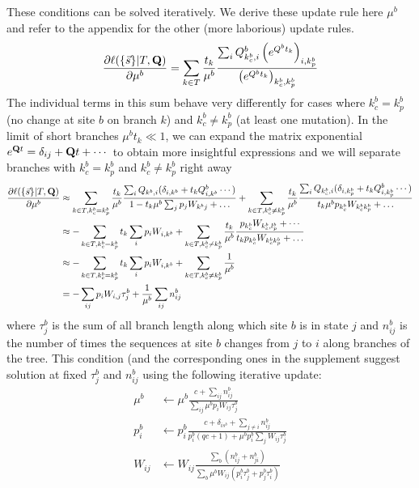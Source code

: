 \documentclass[aps,rmp,twocolumn]{revtex4}
\newcommand{\mat}[1]{{\bf #1}}
\newcommand{\eqp}{p}
\newcommand{\pc}{c}
\begin{document}
These conditions can be solved iteratively. We derive these update rule here $\mu^b$ and refer to the appendix for the other (more laborious) update rules.
\begin{equation}
	\frac{\partial \ell(\{\vec{s}\}|T,\mat{Q})}{\partial \mu^b} = \sum_{k\in T} \frac{t_k}{\mu^b}\frac{\sum_i Q^b_{k^b_c,i}\left( e^{Q^bt_k} \right)_{i, k^b_p}}{\left( e^{Q^bt_k} \right)_{k^b_c, k^b_p}}
\end{equation}
The individual terms in this sum behave very differently for cases where $k^b_c=k^b_p$ (no change at site $b$ on branch $k$) and $k^b_c\neq k^b_p$ (at least one mutation).
In the limit of short branches $\mu^b t_k\ll 1$, we can expand the matrix exponential $e^{\mat{Q}t}=\delta_{ij} + \mat{Q}t+\cdots$ to obtain more insightful expressions and we will separate branches with $k^b_c=k^b_p$  and $k^b_c\neq k^b_p$ right away
\begin{equation}
\begin{split}
	\frac{\partial \ell(\{\vec{s}\}|T,\mat{Q})}{\partial \mu^b} &\approx \sum_{k\in T, k^b_c=k^b_p} \frac{t_k}{\mu^b}\frac{\sum_i Q_{k^b,i}(\delta_{i,k^b} + t_k Q^b_{i,k^b}\cdots)}{1 - t_k\mu^b\sum_{j}\eqp_j W_{k^bj}+\ldots} +
	\sum_{k\in T, k^b_c\neq k^b_p} \frac{t_k}{\mu^b}\frac{\sum_i Q_{k^b_c,i}(\delta_{i,k^b_p} + t_k Q^b_{i,k^b_p}\cdots)}{t_k\mu^b\eqp_{k^b_c} W_{k^b_ck^b_p}+\ldots} \\
		&\approx -\sum_{k\in T, k^b_c=k^b_p}t_k \sum_i \eqp_{i}W_{i,k^b} +
	\sum_{k\in T, k^b_c\neq k^b_p} \frac{t_k}{\mu^b}\frac{p_{k^b_c}W_{k^b_c, l^b_p} + \cdots}{t_k\eqp_{k^b_c} W_{k^b_ck^b_p}+\ldots} \\
		&\approx -\sum_{k\in T, k^b_c=k^b_p}t_k \sum_i \eqp_{i}W_{i,k^b} + 	\sum_{k\in T, k^b_c\neq k^b_p} \frac{1}{\mu^b} \\
		&= -\sum_{ij}\eqp_{i}W_{i,j}\tau_j^b + \frac{1}{\mu^b}\sum_{ij} n^b_{ij}
	\end{split}
\end{equation}
where $\tau^b_j$ is the sum of all branch length along which site $b$ is in state $j$ and $n^b_{ij}$ is the number of times the sequences at site $b$ changes from $j$ to $i$ along branches of the tree.
This condition (and the corresponding ones in the supplement suggest solution at fixed $\tau^b_j$ and $n^b_{ij}$ using the following iterative update:
\begin{equation}
\label{eq:update_app}
	\begin{split}
		\mu^b & \leftarrow \mu^b\frac{\pc+\sum_{ij} n^b_{ij}}{\sum_{ij}\mu^b \eqp_{i}W_{ij}\tau_j^b} \\
		\eqp^b_i & \leftarrow \eqp^b_i\frac{\pc+\delta_{is^{b}} + \sum_{j\neq i} n^b_{ij}}{\eqp^b_i(q\pc+1) + \mu^b\eqp^b_i \sum_{j}W_{ij}\tau_j^b} \\
		W_{ij} & \leftarrow W_{ij}\frac{\sum_b (n^b_{ij}+n^b_{ji})}{\sum_b \mu^b W_{ij}(\eqp_i^b\tau_j^b + \eqp_j^b \tau_i^b)} \\
	\end{split}
\end{equation}
\end{document}
